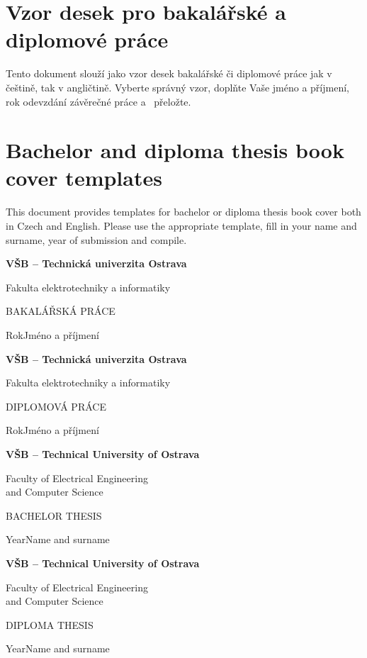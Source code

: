\documentclass[11pt]{article}
\newcommand{\BookCover}[6]
{
	\begin{center}
		\Huge\bfseries
		#1\par\medskip
		#2\par
		\vspace{#3}
		#4\par
	\end{center}
	\vfill
	{\Huge#5\hfill#6}
	\clearpage
}
\begin{document}
\section*{Vzor desek pro bakalářské a diplomové práce}
Tento dokument slouží jako vzor desek bakalářské či diplomové práce jak v češtině, tak v angličtině. Vyberte správný vzor, doplňte Vaše jméno a příjmení, rok odevzdání závěrečné práce a~ přeložte.

\section*{Bachelor and diploma thesis book cover templates}
This document provides templates for bachelor or diploma thesis book cover both in Czech and English. Please use the appropriate template, fill in your name and surname, year of submission and compile.

\clearpage

\BookCover{VŠB -- Technická univerzita Ostrava}{Fakulta elektrotechniky a informatiky}{96mm}{BAKALÁŘSKÁ PRÁCE}{Rok}{Jméno a příjmení}

\BookCover{VŠB -- Technická univerzita Ostrava}{Fakulta elektrotechniky a informatiky}{96mm}{DIPLOMOVÁ PRÁCE}{Rok}{Jméno a příjmení}

\BookCover{VŠB -- Technical University of Ostrava}{Faculty of Electrical Engineering\\and Computer Science}{84mm}{BACHELOR THESIS}{Year}{Name and surname}

\BookCover{VŠB -- Technical University of Ostrava}{Faculty of Electrical Engineering\\and Computer Science}{84mm}{DIPLOMA THESIS}{Year}{Name and surname}
\end{document}
